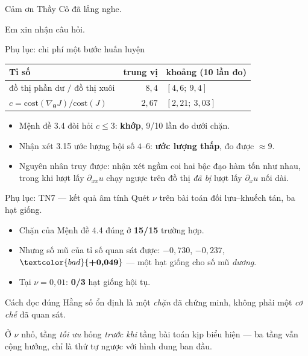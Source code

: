 \documentclass[aspectratio=169,11pt]{beamer}
\newcommand{\btheta}{\bm{\theta}}
\newcommand{\good}[1]{\textcolor{good}{\textbf{#1}}}
\newcommand{\bad}[1]{\textcolor{bad}{\textbf{#1}}}
\begin{document}
\begin{frame}[standout]
Cảm ơn Thầy Cô đã lắng nghe.

\medskip
\normalsize Em xin nhận câu hỏi.
\end{frame}

\appendix

\begin{frame}{Phụ lục: chi phí một bước huấn luyện}
\begin{table}
\small
\begin{tabular}{@{}lrl@{}}
\toprule
\textbf{Tỉ số} & \textbf{trung vị} & \textbf{khoảng} (10 lần đo) \\
\midrule
đồ thị phần dư $/$ đồ thị xuôi & $8{,}4$ & $[4{,}6;\ 9{,}4]$ \\
$c = \mathrm{cost}(\nabla_{\btheta}J)/\mathrm{cost}(J)$ & $2{,}67$ & $[2{,}21;\ 3{,}03]$ \\
\bottomrule
\end{tabular}
\end{table}

\begin{itemize}
\item Mệnh đề 3.4 đòi hỏi $c \le 3$: \good{khớp}, 9/10 lần đo dưới chặn.
\item Nhận xét 3.15 ước lượng bội số $4$--$6$: \bad{ước lượng thấp}, đo được $\approx 9$.
\item Nguyên nhân truy được: nhận xét ngầm coi hai bậc đạo hàm tốn như nhau,
  trong khi lượt lấy $\partial_{xx}u$ chạy ngược trên đồ thị \emph{đã bị}
  lượt lấy $\partial_x u$ nối dài.
\end{itemize}
\end{frame}

\begin{frame}{Phụ lục: TN7 --- kết quả âm tính}
Quét $\nu$ trên bài toán đối lưu--khuếch tán, ba hạt giống.

\begin{itemize}
\item Chặn của Mệnh đề 4.4 đúng ở \good{15/15} trường hợp.
\item Nhưng số mũ của tỉ số quan sát được: $-0{,}730$, $-0{,}237$, $\bad{+0{,}049}$
  --- một hạt giống cho số mũ \emph{dương}.
\item Tại $\nu = 0{,}01$: \bad{0/3} hạt giống hội tụ.
\end{itemize}

\medskip
\begin{alertblock}{Cách đọc đúng}
Hằng số ổn định là một \emph{chặn} đã chứng minh,
\alert{không phải một \emph{cơ chế} đã quan sát}.

\smallskip
\footnotesize Ở $\nu$ nhỏ, tầng \emph{tối ưu} hỏng \emph{trước khi} tầng bài toán
kịp biểu hiện --- ba tầng vẫn cộng hưởng, chỉ là thứ tự ngược với hình dung ban đầu.
\end{alertblock}
\end{frame}
\end{document}
